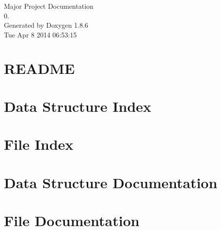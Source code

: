 \documentclass[twoside]{book}
\newcommand{\clearemptydoublepage}{%
  \newpage{\pagestyle{empty}\cleardoublepage}%
}
\begin{document}
\begin{titlepage}
\vspace*{7cm}
\begin{center}%
{\Large Major Project Documentation \\[1ex]\large 0. }\\
\vspace*{1cm}
{\large Generated by Doxygen 1.8.6}\\
\vspace*{0.5cm}
{\small Tue Apr 8 2014 06:53:15}\\
\end{center}
\end{titlepage}
\clearemptydoublepage
\tableofcontents
\clearemptydoublepage
{}

\chapter{R\-E\-A\-D\-M\-E}
\label{md__c_1__users__stefan__documents__git_hub__final__project__r_e_a_d_m_e}

\chapter{Data Structure Index}

\chapter{File Index}

\chapter{Data Structure Documentation}

\chapter{File Documentation}


































\newpage
{}
{}
\printindex
\end{document}
